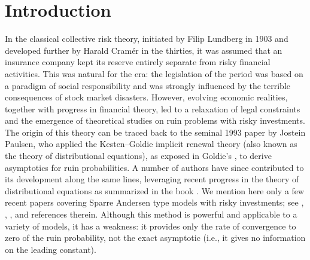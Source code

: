 \begin{abstract}
In the classical annuity payments model, the capital reserve of an insurance company decreases at a constant rate and increases via positive jumps. We consider a generalization of this model by supposing that a fixed portion of the capital reserve is continuously invested in a risky asset whose price follows a geometric Brownian motion, while the complementary part is placed in a bank account with a constant interest rate. The quantity of interest is the ruin probability on the infinite time horizon as a function of the initial capital. Under rather weak assumptions on the distribution of jumps, we prove that the ruin probability is the classical solution of a second-order integro-differential equation and obtain its exact asymptotics for large values of the initial capital.
\end{abstract}



\section{Introduction}
In the classical collective risk theory, initiated by Filip Lundberg in 1903 and developed further by Harald Cram\'er in the thirties, it was assumed that an insurance company kept its reserve entirely separate from risky financial activities. This was natural for the era: the legislation of the period was based on a paradigm of social responsibility and was strongly influenced by the terrible consequences of stock market disasters. However, evolving economic realities, together with progress in financial theory, led to a relaxation of legal constraints and the emergence of theoretical studies on ruin problems with risky investments. The origin of this theory can be traced back to the seminal 1993 paper by Jostein Paulsen, who applied the Kesten--Goldie implicit renewal theory (also known as the theory of distributional equations), as exposed in Goldie's \cite{Go91}, to derive asymptotics for ruin probabilities. A number of authors have since contributed to its development along the same lines, leveraging recent progress in the theory of distributional equations as summarized in the book \cite{BDM}. We mention here only a few recent papers covering Sparre Andersen type models with risky investments; see \cite{EKS}, \cite{KPro}, \cite{KLP}, and references therein. Although this method is powerful and applicable to a variety of models, it has a weakness: it provides only the rate of convergence to zero of the ruin probability, not the exact asymptotic (i.e., it gives no information on the leading constant).

